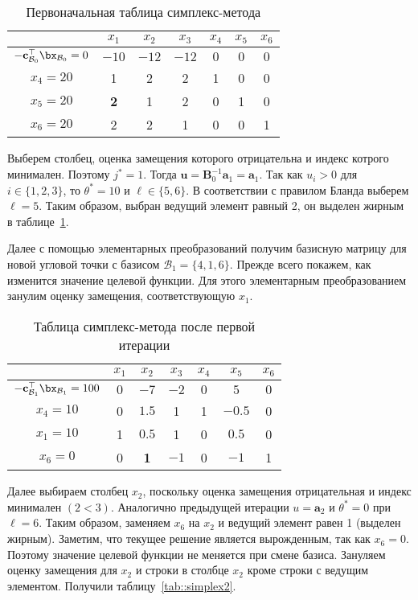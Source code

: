 \documentclass[12pt]{article}
\begin{document}
\begin{table}[!ht]
\centering
\caption{Первоначальная таблица симплекс-метода}
\begin{tabular}{|c|cccccc|}
\hline
& $x_1$ & $x_2$ & $x_3$ & $x_4$ & $x_5$ & $x_6$\\
\hline
$-\mathbf{c}_{\mathcal{B}_0}^{\top}\bx_{\mathcal{B}_0} = 0$ & $-10$ & $-12$ & $-12$ & $0$ & $0$ & $0$ \\
\hline
$x_4 = 20$ & 1 & 2 & 2 & 1 & 0 & 0 \\
$x_5 = 20$ & \textbf{2} & 1 & 2 & 0 & 1 & 0 \\
$x_6 = 20$ & 2 & 2 & 1 & 0 & 0 & 1 \\
\hline
\end{tabular}
\label{tab::simplex0}
\end{table}
Выберем столбец, оценка замещения которого отрицательна и индекс котрого минимален.
Поэтому $j^* = 1$.
Тогда $\mathbf{u} = \mathbf{B}^{-1}_0\mathbf{a}_1 = \mathbf{a}_1.$
Так как $u_i > 0$ для $i \in \{1,2,3\}$, то $\theta^* = 10$ и $\ell \in \{5, 6\}$.
В соответствии с правилом Бланда выберем $\ell = 5$.
Таким образом, выбран ведущий элемент равный 2, он выделен жирным в таблице~\ref{tab::simplex0}.

Далее с помощью элементарных преобразований получим базисную матрицу для новой угловой точки с базисом $\mathcal{B}_1 = \{4, 1, 6\}$. 
Прежде всего покажем, как изменится значение целевой функции.
Для этого элементарным преобразованием занулим оценку замещения, соответствующую $x_1$.

\begin{table}[!ht]
\centering
\caption{Таблица симплекс-метода после первой итерации}
\begin{tabular}{|c|cccccc|}
\hline
& $x_1$ & $x_2$ & $x_3$ & $x_4$ & $x_5$ & $x_6$\\
\hline
$-\mathbf{c}_{\mathcal{B}_1}^{\top}\bx_{\mathcal{B}_1} = 100$ & $0$ & $-7$ & $-2$ & $0$ & $5$ & $0$ \\
\hline
$x_4 = 10$ & 0 & $1.5$ & 1 & 1 & $-0.5$ & 0 \\
$x_1 = 10$ & 1 & $0.5$ & 1 & 0 & $0.5$ & 0 \\
$x_6 = 0$ & 0 & \textbf{1} & $-1$ & 0 & $-1$ & 1 \\
\hline
\end{tabular}
\label{tab::simplex1}
\end{table}

Далее выбираем столбец $x_2$, поскольку оценка замещения отрицательная и индекс минимален $(2 < 3)$.
Аналогично предыдущей итерации $u = \mathbf{a}_2$ и $\theta^* = 0$ при $\ell = 6$. 
Таким образом, заменяем $x_6$ на $x_2$ и ведущий элемент равен 1 (выделен жирным). 
Заметим, что текущее решение является вырожденным, так как $x_6 = 0$. 
Поэтому значение целевой функции не меняется при смене базиса. 
Зануляем оценку замещения для $x_2$ и строки в столбце $x_2$ кроме строки с ведущим элементом. 
Получили таблицу~\ref{tab::simplex2}.
\end{document}
